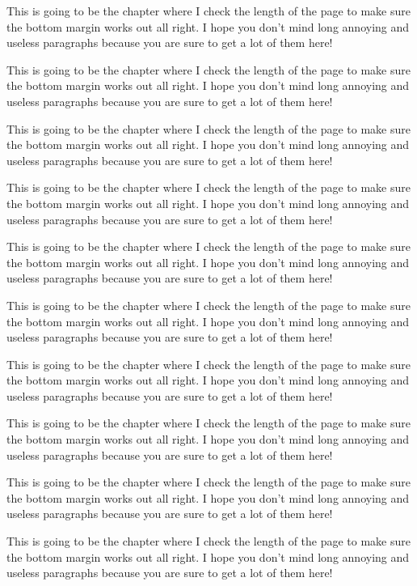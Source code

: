 This is going to be the chapter where I check the length of the page
to make sure the bottom margin works out all right.  I hope you don't
mind long annoying and useless paragraphs because you are sure to get
a lot of them here!

This is going to be the chapter where I check the length of the page
to make sure the bottom margin works out all right.  I hope you don't
mind long annoying and useless paragraphs because you are sure to get
a lot of them here!

This is going to be the chapter where I check the length of the page
to make sure the bottom margin works out all right.  I hope you don't
mind long annoying and useless paragraphs because you are sure to get
a lot of them here!

This is going to be the chapter where I check the length of the page
to make sure the bottom margin works out all right.  I hope you don't
mind long annoying and useless paragraphs because you are sure to get
a lot of them here!

This is going to be the chapter where I check the length of the page
to make sure the bottom margin works out all right.  I hope you don't
mind long annoying and useless paragraphs because you are sure to get
a lot of them here!

This is going to be the chapter where I check the length of the page
to make sure the bottom margin works out all right.  I hope you don't
mind long annoying and useless paragraphs because you are sure to get
a lot of them here!

This is going to be the chapter where I check the length of the page
to make sure the bottom margin works out all right.  I hope you don't
mind long annoying and useless paragraphs because you are sure to get
a lot of them here!

This is going to be the chapter where I check the length of the page
to make sure the bottom margin works out all right.  I hope you don't
mind long annoying and useless paragraphs because you are sure to get
a lot of them here!

This is going to be the chapter where I check the length of the page
to make sure the bottom margin works out all right.  I hope you don't
mind long annoying and useless paragraphs because you are sure to get
a lot of them here!

This is going to be the chapter where I check the length of the page
to make sure the bottom margin works out all right.  I hope you don't
mind long annoying and useless paragraphs because you are sure to get
a lot of them here!


